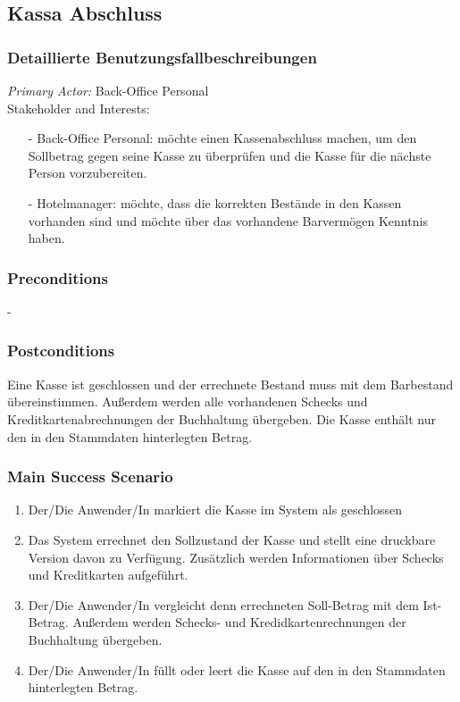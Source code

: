 \documentclass[./detailed_overview_usecases.tex]{subfiles}
\begin{document}
    \subsection{Kassa Abschluss}
    \subsubsection{Detaillierte Benutzungsfallbeschreibungen}
    \textit{Primary Actor:}
    Back-Office Personal
    \\
    Stakeholder and Interests:
    \begin{itemize}
        \item[-] Back-Office Personal: möchte einen Kassenabschluss
        machen, um den Sollbetrag gegen seine Kasse zu überprüfen und die Kasse für
        die nächste Person vorzubereiten.
        \item[-] Hotelmanager: möchte, dass die korrekten Bestände in
        den Kassen vorhanden sind und möchte über das vorhandene Barvermögen
        Kenntnis haben.
    \end{itemize}

    \subsubsection*{Preconditions}
     -

    \subsubsection*{Postconditions}
    Eine Kasse ist geschlossen und der errechnete Bestand muss mit dem
    Barbestand übereinstimmen. Außerdem werden alle vorhandenen Schecks und
    Kreditkartenabrechnungen der Buchhaltung übergeben.
    Die Kasse enthält nur den in den Stammdaten hinterlegten Betrag.

    \subsubsection*{Main Success Scenario}
    \begin{enumerate}
        \item Der/Die Anwender/In markiert die Kasse im System als geschlossen
        \item Das System errechnet den Sollzustand der Kasse und stellt eine druckbare
        Version davon zu Verfügung. Zusätzlich werden Informationen über Schecks und Kreditkarten
        aufgeführt.
        \item Der/Die Anwender/In vergleicht denn errechneten Soll-Betrag mit dem
        Ist-Betrag. Außerdem werden Schecks- und Kredidkartenrechnungen der Buchhaltung übergeben.
        \item Der/Die Anwender/In füllt oder leert die Kasse auf den in den Stammdaten hinterlegten Betrag.
    \end{enumerate}
\end{document}
